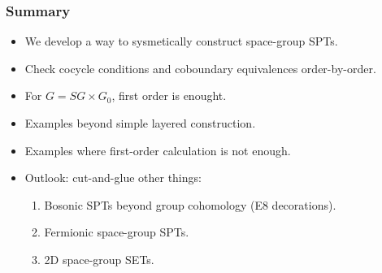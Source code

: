 \documentclass[xcolor=table, 10pt, aspectratio=43]{beamer}
\begin{document}
\begin{frame}
\frametitle{Summary}
\begin{itemize}
\item We develop a way to sysmetically construct space-group SPTs.
\item Check cocycle conditions and coboundary equivalences order-by-order.
\item For $G=SG\times G_0$, first order is enought.
\item Examples beyond simple layered construction.
\item Examples where first-order calculation is not enough.
\item Outlook: cut-and-glue other things:
\begin{enumerate}
\item Bosonic SPTs beyond group cohomology (E8 decorations).
\item Fermionic space-group SPTs.
\item 2D space-group SETs.
\end{enumerate}
\end{itemize}
\end{frame}
\end{document}
